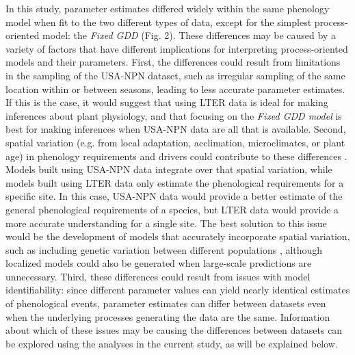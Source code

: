 \documentclass[fleqn,12pt,lineno]{article}
\begin{document}
In this study, parameter estimates differed widely within the same phenology model when fit to the two different types of data, except for the simplest process-oriented model: the \textit{Fixed GDD} (Fig. 2). These differences may be caused by a variety of factors that have different implications for interpreting process-oriented models and their parameters. First, the differences could result from limitations in the sampling of the USA-NPN dataset, such as irregular sampling of the same location within or between seasons, leading to less accurate parameter estimates. If this is the case, it would suggest that using LTER data is ideal for making inferences about plant physiology, and that focusing on the \textit{Fixed GDD model} is best for making inferences when USA-NPN data are all that is available. Second, spatial variation (e.g. from local adaptation, acclimation, microclimates, or plant age)  in phenology requirements and drivers could contribute to these differences \citep{diez2012, zhang2017}. Models built using USA-NPN data integrate over that spatial variation, while models built using LTER data only estimate the phenological requirements for a specific site. In this case, USA-NPN data would provide a better estimate of the general phenological requirements of a species, but LTER data would provide a more accurate understanding for a single site. The best solution to this issue would be the development of models that accurately incorporate spatial variation, such as including genetic variation between different populations \citep{chuine2017}, although localized models could also be generated when large-scale predictions are unnecessary. Third, these differences could result from issues with model identifiability: since different parameter values can yield nearly identical estimates of phenological events, parameter estimates can differ between datasets even when the underlying processes generating the data are the same. Information about which of these issues may be causing the differences between datasets can be explored using the analyses in the current study, as will be explained below.
\end{document}
